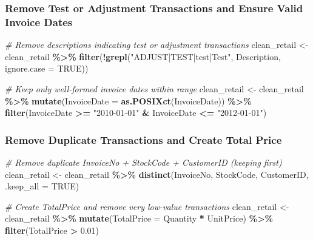 \documentclass[
]{article}
\newenvironment{Shaded}{\begin{snugshade}}{\end{snugshade}}
\newcommand{\AttributeTok}[1]{\textcolor[rgb]{0.13,0.29,0.53}{#1}}
\newcommand{\CommentTok}[1]{\textcolor[rgb]{0.56,0.35,0.01}{\textit{#1}}}
\newcommand{\ConstantTok}[1]{\textcolor[rgb]{0.56,0.35,0.01}{#1}}
\newcommand{\FloatTok}[1]{\textcolor[rgb]{0.00,0.00,0.81}{#1}}
\newcommand{\FunctionTok}[1]{\textcolor[rgb]{0.13,0.29,0.53}{\textbf{#1}}}
\newcommand{\NormalTok}[1]{#1}
\newcommand{\OtherTok}[1]{\textcolor[rgb]{0.56,0.35,0.01}{#1}}
\newcommand{\SpecialCharTok}[1]{\textcolor[rgb]{0.81,0.36,0.00}{\textbf{#1}}}
\newcommand{\StringTok}[1]{\textcolor[rgb]{0.31,0.60,0.02}{#1}}
\begin{document}
\subsubsection{Remove Test or Adjustment Transactions and Ensure Valid
Invoice
Dates}\label{remove-test-or-adjustment-transactions-and-ensure-valid-invoice-dates}

\begin{Shaded}
\begin{Highlighting}[]
\CommentTok{\# Remove descriptions indicating test or adjustment transactions}
\NormalTok{clean\_retail }\OtherTok{\textless{}{-}}\NormalTok{ clean\_retail }\SpecialCharTok{\%\textgreater{}\%}
  \FunctionTok{filter}\NormalTok{(}\SpecialCharTok{!}\FunctionTok{grepl}\NormalTok{(}\StringTok{"ADJUST|TEST|test|Test"}\NormalTok{, Description, }\AttributeTok{ignore.case =} \ConstantTok{TRUE}\NormalTok{))}

\CommentTok{\# Keep only well{-}formed invoice dates within range}
\NormalTok{clean\_retail }\OtherTok{\textless{}{-}}\NormalTok{ clean\_retail }\SpecialCharTok{\%\textgreater{}\%}
  \FunctionTok{mutate}\NormalTok{(}\AttributeTok{InvoiceDate =} \FunctionTok{as.POSIXct}\NormalTok{(InvoiceDate)) }\SpecialCharTok{\%\textgreater{}\%}
  \FunctionTok{filter}\NormalTok{(InvoiceDate }\SpecialCharTok{\textgreater{}=} \StringTok{"2010{-}01{-}01"} \SpecialCharTok{\&}\NormalTok{ InvoiceDate }\SpecialCharTok{\textless{}=} \StringTok{"2012{-}01{-}01"}\NormalTok{)}
\end{Highlighting}
\end{Shaded}

\subsubsection{Remove Duplicate Transactions and Create Total
Price}\label{remove-duplicate-transactions-and-create-total-price}

\begin{Shaded}
\begin{Highlighting}[]
\CommentTok{\# Remove duplicate InvoiceNo + StockCode + CustomerID (keeping first)}
\NormalTok{clean\_retail }\OtherTok{\textless{}{-}}\NormalTok{ clean\_retail }\SpecialCharTok{\%\textgreater{}\%}
  \FunctionTok{distinct}\NormalTok{(InvoiceNo, StockCode, CustomerID, }\AttributeTok{.keep\_all =} \ConstantTok{TRUE}\NormalTok{)}

\CommentTok{\# Create TotalPrice and remove very low{-}value transactions}
\NormalTok{clean\_retail }\OtherTok{\textless{}{-}}\NormalTok{ clean\_retail }\SpecialCharTok{\%\textgreater{}\%}
  \FunctionTok{mutate}\NormalTok{(}\AttributeTok{TotalPrice =}\NormalTok{ Quantity }\SpecialCharTok{*}\NormalTok{ UnitPrice) }\SpecialCharTok{\%\textgreater{}\%}
  \FunctionTok{filter}\NormalTok{(TotalPrice }\SpecialCharTok{\textgreater{}} \FloatTok{0.01}\NormalTok{)}
\end{Highlighting}
\end{Shaded}
\end{document}
